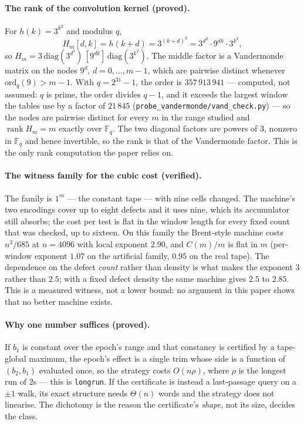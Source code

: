 \paragraph{The rank of the convolution kernel (proved).} For $h(k)=3^{k^{2}}$ and modulus $q$,
\[
H_{m}[d,k]=h(k+d)=3^{(k+d)^{2}}=3^{d^{2}}\cdot 9^{dk}\cdot 3^{k^{2}},
\]
so $H_{m}=3\,\mathrm{diag}(3^{d^{2}})\,[9^{dk}]\,\mathrm{diag}(3^{k^{2}})$. The middle factor is a
Vandermonde matrix on the nodes $9^{d}$, $d=0,\dots,m-1$, which are pairwise distinct whenever
$\mathrm{ord}_{q}(9)>m-1$. With $q=2^{31}-1$, the order is $357\,913\,941$ --- computed, not assumed:
$q$ is prime, the order divides $q-1$, and it exceeds the largest window the tables use by a factor of
$21\,845$ (\texttt{probe\_vandermonde/vand\_check.py}) --- so the nodes are pairwise distinct for every
$m$ in the range studied and $\operatorname{rank}H_{m}=m$ exactly over $\mathbb F_{q}$. The two diagonal
factors are powers of $3$, nonzero in $\mathbb F_{q}$ and hence invertible, so the rank is that of the
Vandermonde factor. This is the only rank computation the paper
relies on.

\paragraph{The witness family for the cubic cost (verified).} The family is $1^{m}$ --- the constant
tape --- with nine cells changed. The machine's two encodings cover up to eight defects and it uses nine,
which its accumulator still absorbs; the cost per test is flat in the window length for every fixed
count that was checked, up to sixteen. On this family the Brent-style machine costs $n^{3}/685$ at $n=4096$ with local
exponent $2.90$, and $C(m)/m$ is flat in $m$ (per-window exponent $1.07$ on the artificial family,
$0.95$ on the real tape). The dependence on the defect \emph{count} rather than density is what makes
the exponent $3$ rather than $2.5$; with a fixed defect density the same machine gives $2.5$ to
$2.85$. This is a measured witness, not a lower bound: no argument in this paper shows that no better
machine exists.

\paragraph{Why one number suffices (proved).} If $b_1$ is constant over the epoch's range and that
constancy is certified by a tape-global maximum, the epoch's effect is a single trim whose side is a
function of $(b_2,b_1)$ evaluated once, so the strategy costs $O(n\rho)$, where $\rho$ is the longest
run of $2$s --- this is \texttt{longrun}. If the certificate is instead a last-passage query on a
$\pm1$ walk, its exact structure needs $\Theta(n)$ words and the strategy does not linearise. The
dichotomy is the reason the certificate's \emph{shape}, not its size, decides the class.


